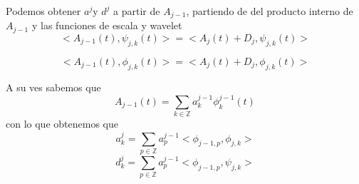 \documentclass{beamer}
\begin{document}
  \begin{frame}
   Podemos obtener $a^{j}$y $d^{j}$ a partir de $A_{j-1}$, partiendo de del 	producto interno de $A_{j-1}$ y las funciones de escala y wavelet
   \begin{equation}
<A_{j-1}(t),\psi _{j,k}(t)>=<A_{j}(t)+D_{j},\psi _{j,k}(t)>
\end{equation}

\begin{equation}
<A_{j-1}(t),\phi _{j,k}(t)>=<A_{j}(t)+D_{j},\phi _{j,k}(t)>
\end{equation}
  \end{frame}
  
  \begin{frame}
  A su ves sabemos que 
  \begin{equation}
  A_{j-1}(t)=\sum_{k \in \mathbb{Z}} a^{j-1}_{k} \phi^{j-1}_{k}(t)
  \end{equation}
  con lo que obtenemos que 
  \begin{equation}
  a^{j}_{k}=\sum_{p \in \mathbb{Z}} a^{j-1}_{p} <\phi_{j-1,p},\phi_{j,k}>
  \end{equation}
  \begin{equation}
  d^{j}_{k}=\sum_{p \in \mathbb{Z}} a^{j-1}_{p} <\phi_{j-1,p},\psi_{j,k}>
  \end{equation}
  \end{frame}
  
\end{document}
